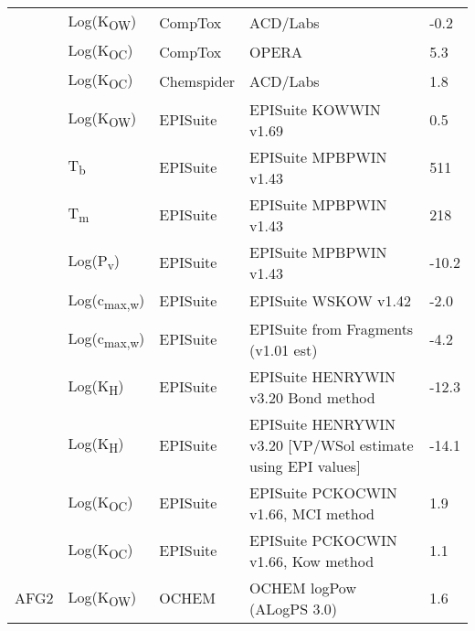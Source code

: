 \begin{landscape}
\begin{longtable}[c]{lllll}
          & Log(K\textsubscript{OW})      & CompTox    & ACD/Labs                                                                        & -0.2  \\
          & Log(K\textsubscript{OC})      & CompTox    & OPERA                                                                           & 5.3   \\
          & Log(K\textsubscript{OC})      & Chemspider & ACD/Labs                                                                        & 1.8   \\
          & Log(K\textsubscript{OW})      & EPISuite   & EPISuite KOWWIN v1.69                                                           & 0.5   \\
          & T\textsubscript{b}          & EPISuite   & EPISuite MPBPWIN v1.43                                                          & 511   \\
          & T\textsubscript{m}          & EPISuite   & EPISuite MPBPWIN v1.43                                                          & 218   \\
          & Log(P\textsubscript{v})       & EPISuite   & EPISuite MPBPWIN v1.43                                                          & -10.2 \\
          & Log(c\textsubscript{max,w}) & EPISuite   & EPISuite WSKOW v1.42                                                            & -2.0  \\
          & Log(c\textsubscript{max,w}) & EPISuite   & EPISuite from Fragments (v1.01 est)                                             & -4.2  \\
          & Log(K\textsubscript{H})       & EPISuite   & EPISuite HENRYWIN v3.20 Bond method                                             & -12.3 \\
          & Log(K\textsubscript{H})       & EPISuite   & EPISuite HENRYWIN v3.20 [VP/WSol estimate using EPI values]                     & -14.1 \\
          & Log(K\textsubscript{OC})      & EPISuite   & EPISuite PCKOCWIN v1.66, MCI method                                             & 1.9   \\
          & Log(K\textsubscript{OC})      & EPISuite   & EPISuite PCKOCWIN v1.66, Kow method                                             & 1.1   \\
          \hline
AFG2      & Log(K\textsubscript{OW})      & OCHEM      & OCHEM logPow (ALogPS 3.0)                                                       & 1.6   \\

\end{longtable}
\end{landscape}
